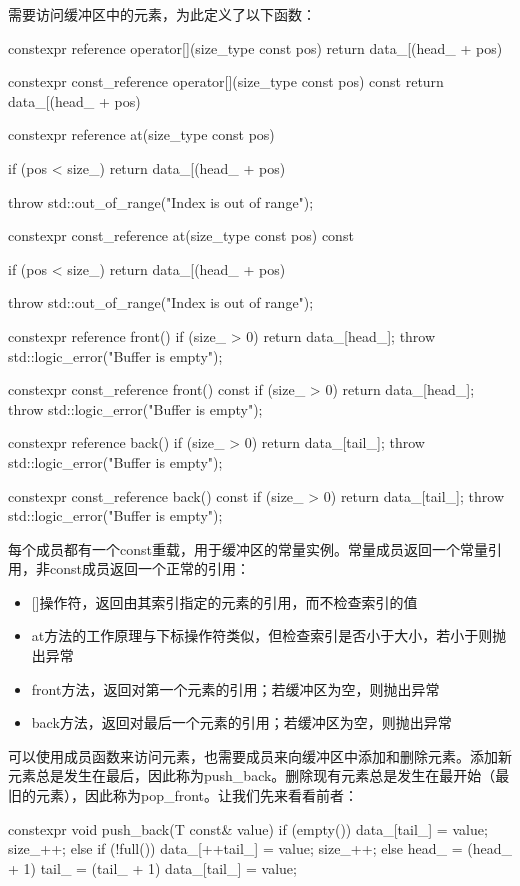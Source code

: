 需要访问缓冲区中的元素，为此定义了以下函数：

\begin{cppcode}
constexpr reference operator[](size_type const pos)
{
	return data_[(head_ + pos) %
}

constexpr const_reference operator[](size_type const pos) const
{
	return data_[(head_ + pos) %
}

constexpr reference at(size_type const pos)
{
	if (pos < size_)
		return data_[(head_ + pos) %
		
	throw std::out_of_range("Index is out of range");
}

constexpr const_reference at(size_type const pos) const
{
	if (pos < size_)
		return data_[(head_ + pos) %
		
	throw std::out_of_range("Index is out of range");
}

constexpr reference front()
{
	if (size_ > 0) return data_[head_];
	throw std::logic_error("Buffer is empty");
}

constexpr const_reference front() const
{
	if (size_ > 0) return data_[head_];
	throw std::logic_error("Buffer is empty");
}

constexpr reference back()
{
	if (size_ > 0) return data_[tail_];
	throw std::logic_error("Buffer is empty");
}

constexpr const_reference back() const
{
	if (size_ > 0) return data_[tail_];
	throw std::logic_error("Buffer is empty");
}
\end{cppcode}

每个成员都有一个const重载，用于缓冲区的常量实例。常量成员返回一个常量引用，非const成员返回一个正常的引用：

\begin{itemize}
  \item {}[]操作符，返回由其索引指定的元素的引用，而不检查索引的值
  \item at方法的工作原理与下标操作符类似，但检查索引是否小于大小，若小于则抛出异常
  \item front方法，返回对第一个元素的引用；若缓冲区为空，则抛出异常
  \item back方法，返回对最后一个元素的引用；若缓冲区为空，则抛出异常
\end{itemize}

可以使用成员函数来访问元素，也需要成员来向缓冲区中添加和删除元素。添加新元素总是发生在最后，因此称为push_back。删除现有元素总是发生在最开始（最旧的元素），因此称为pop_front。让我们先来看看前者：

\begin{cppcode}
constexpr void push_back(T const& value)
{
	if (empty())
	{
		data_[tail_] = value;
		size_++;
	}
	else if (!full())
	{
		data_[++tail_] = value;
		size_++;
	}
	else
	{
		head_ = (head_ + 1) %
		tail_ = (tail_ + 1) %
		data_[tail_] = value;
	}
}
\end{cppcode}

